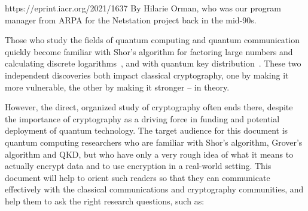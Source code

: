 



https://eprint.iacr.org/2021/1637
By Hilarie Orman, who was our program manager from ARPA for the Netstation project back in the mid-90s.


Those who study the fields of quantum computing and quantum
communication quickly become familiar with Shor's algorithm for
factoring large numbers and calculating discrete
logarithms~\cite{shor:siam-factor}, and with quantum key
distribution~\cite{bennett:bb84,PhysRevLett.68.557,ekert1991qcb,PhysRevLett.108.130503,xu2015measurement,Vazirani:2019:FDI:3321370.3310974,RevModPhys.81.1301,PhysRevLett.85.441}.
These two independent discoveries both impact classical cryptography,
one by making it more vulnerable, the other by making it stronger --
in theory.

However, the direct, organized study of cryptography often ends there,
despite the importance of cryptography as a driving force in funding
and potential deployment of quantum technology.  The target audience
for this document is quantum computing researchers who are familiar
with Shor's algorithm, Grover's algorithm and QKD, but who have only a
very rough idea of what it means to actually encrypt data and to use
encryption in a real-world setting.  This document will help to orient
such readers so that they can communicate effectively with the
classical communications and cryptography communities, and help them
to ask the right research questions, such as:

